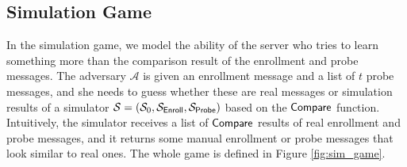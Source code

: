 \subsection*{Simulation Game}
\label{sec:simulation_game}

In the simulation game, we model the ability of the server who tries to learn something more than the comparison result of the enrollment and probe messages. The adversary $\mathcal{A}$ is given an enrollment message and a list of $t$ probe messages, and she needs to guess whether these are real messages or simulation results of a simulator $\mathcal{S} = (\mathcal{S}_0, \mathcal{S}_{\sf Enroll}, \mathcal{S}_{\sf Probe})$ based on the $\sf Compare$ function. Intuitively, the simulator receives a list of $\sf Compare$ results of real enrollment and probe messages, and it returns some manual enrollment or probe messages that look similar to real ones. The whole game is defined in Figure \ref{fig:sim_game}.

